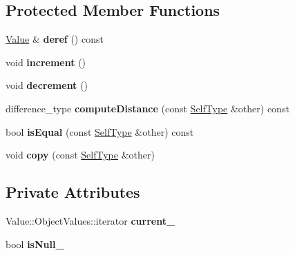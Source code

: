 \subsection*{Protected Member Functions}
\begin{DoxyCompactItemize}
\item 
\mbox{\label{classJson_1_1ValueIteratorBase_aa5b75c9514a30ba2ea3c9a35c165c18e}} 
\hyperlink{classJson_1_1Value}{Value} \& {\bfseries deref} () const
\item 
\mbox{\label{classJson_1_1ValueIteratorBase_afe58f9534e1fd2033419fd9fe244551e}} 
void {\bfseries increment} ()
\item 
\mbox{\label{classJson_1_1ValueIteratorBase_affc8cf5ff54a9f432cc693362c153fa6}} 
void {\bfseries decrement} ()
\item 
\mbox{\label{classJson_1_1ValueIteratorBase_af11473c9e20d07782e42b52a2f9e4540}} 
difference\+\_\+type {\bfseries compute\+Distance} (const \hyperlink{classJson_1_1ValueIteratorBase}{Self\+Type} \&other) const
\item 
\mbox{\label{classJson_1_1ValueIteratorBase_a010b5ad3f3337ae3732e5d7e16ca5e25}} 
bool {\bfseries is\+Equal} (const \hyperlink{classJson_1_1ValueIteratorBase}{Self\+Type} \&other) const
\item 
\mbox{\label{classJson_1_1ValueIteratorBase_a496e6aba44808433ec5858c178be5719}} 
void {\bfseries copy} (const \hyperlink{classJson_1_1ValueIteratorBase}{Self\+Type} \&other)
\end{DoxyCompactItemize}
\subsection*{Private Attributes}
\begin{DoxyCompactItemize}
\item 
\mbox{\label{classJson_1_1ValueIteratorBase_ab3138ce8af8301cca3b041ea55cb922a}} 
Value\+::\+Object\+Values\+::iterator {\bfseries current\+\_\+}
\item 
\mbox{\label{classJson_1_1ValueIteratorBase_a3e08b114a1aed9bde518c527f94a8c59}} 
bool {\bfseries is\+Null\+\_\+}
\end{DoxyCompactItemize}


